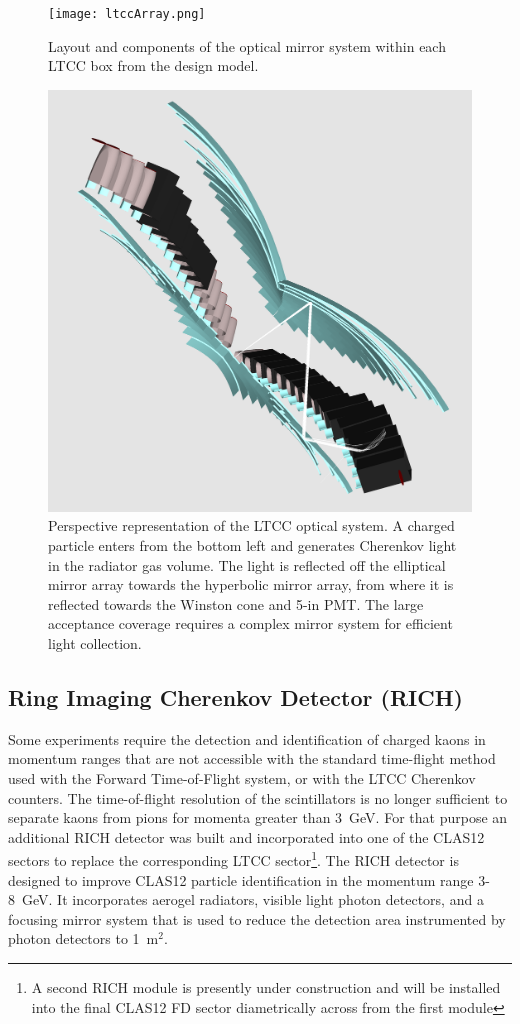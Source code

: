 \documentclass[final,3p,twocolumn]{elsarticle}
\begin{document}
\begin{figure}[htbp!]
\centerline{\texttt{[image: ltccArray.png]}}
\caption{Layout and components of the optical mirror system within each LTCC box from the design model.}
\label{ltcc1}
\end{figure}
\begin{figure}[htbp!]
\centerline{\includegraphics[width=0.95\columnwidth]{ltcc-mod6.png}}
\caption{Perspective representation of the LTCC optical system. A charged particle enters from the bottom left
  and generates Cherenkov light in the radiator gas volume. The light is reflected off the elliptical mirror array
  towards the hyperbolic mirror array, from where it is reflected towards the Winston cone and 5-in PMT. The
  large acceptance coverage requires a complex mirror system for efficient light collection.}
\label{ltcc2}
\end{figure}

\subsection{Ring Imaging Cherenkov Detector (RICH)} 

Some experiments require the detection and identification of charged kaons in momentum ranges that are not 
accessible with the standard time-flight method used with the Forward Time-of-Flight system, or with the LTCC
Cherenkov counters. The time-of-flight resolution of the scintillators is no longer sufficient to separate kaons
from pions for momenta greater than 3~GeV. For that purpose an additional RICH detector was built and incorporated
into one of the CLAS12 sectors to replace the corresponding LTCC sector\footnote{A second RICH module is presently
  under construction and will be installed into the final CLAS12 FD sector diametrically across from the first module}. The
RICH detector is designed to improve CLAS12 particle identification in the momentum range 3-8~GeV. It incorporates
aerogel radiators, visible light photon detectors, and a focusing mirror system that is used to reduce the detection area
instrumented by photon detectors to 1~m$^2$.
\end{document}
